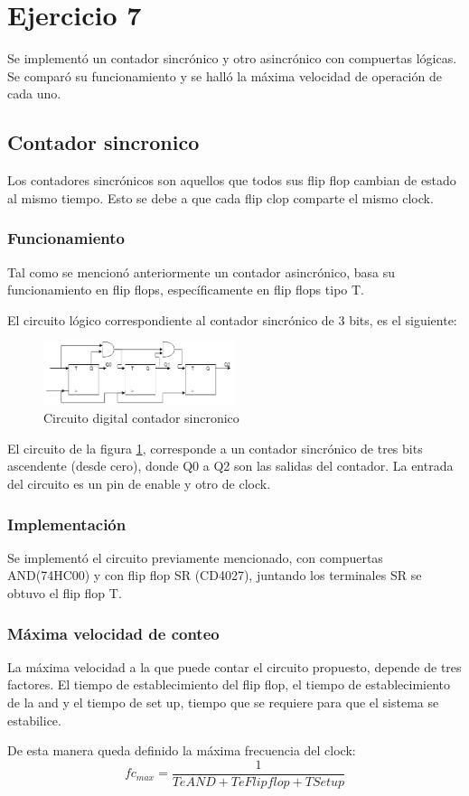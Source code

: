 \documentclass[../../e3_tp2_main.tex]{subfiles}
\begin{document}
\section{Ejercicio 7}


Se implementó un contador sincrónico y otro asincrónico con compuertas lógicas. Se comparó su funcionamiento y se halló la máxima velocidad de operación de cada uno.

\subsection{Contador sincronico}
Los contadores sincrónicos son aquellos que todos sus flip flop cambian de estado al mismo tiempo. Esto se debe a que cada flip clop comparte el mismo clock.
\subsubsection{Funcionamiento}
Tal como se mencionó anteriormente un contador asincrónico, basa su funcionamiento en flip flops, específicamente en flip flops tipo T.
\par El circuito lógico correspondiente al contador sincrónico de 3 bits, es el siguiente:


\begin{figure}[H]	
	\centering
	\includegraphics[width=0.5\textwidth]{imagenes/cs_b.png}
	\caption{Circuito digital contador sincronico}\label{fig:cse}
\end{figure}
El circuito de la figura \ref{fig:cse}, corresponde a un contador sincrónico de tres bits ascendente (desde cero), donde Q0 a Q2 son las salidas del contador. La entrada del circuito es un pin de enable y otro de clock.

\subsubsection{Implementación}

Se implementó el circuito previamente mencionado, con compuertas AND(74HC00) y con flip flop SR (CD4027), juntando los terminales SR se obtuvo el flip flop T.

\subsubsection{Máxima velocidad de conteo}
La máxima velocidad a la que puede contar el circuito propuesto, depende de tres factores. El tiempo de establecimiento del flip flop, el tiempo de establecimiento de la and y el tiempo de set up, tiempo que se requiere para que el sistema se estabilice.
\par De esta manera queda definido la máxima frecuencia del clock:
$$fc_{max}=\frac{1}{TeAND +TeFlipflop +TSetup   } $$
\end{document}
